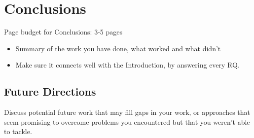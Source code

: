 
\chapter{Conclusions}
\label{ch:conclusion}
Page budget for Conclusions: 3-5 pages
\begin{itemize}
    \item Summary of the work you have done, what worked and what didn't
    \item Make sure it connects well with the Introduction, by answering every RQ.
\end{itemize}

\section{Future Directions}
Discuss potential future work that may fill gaps in your work, or approaches that seem promising to overcome problems you encountered but that you weren't able to tackle.